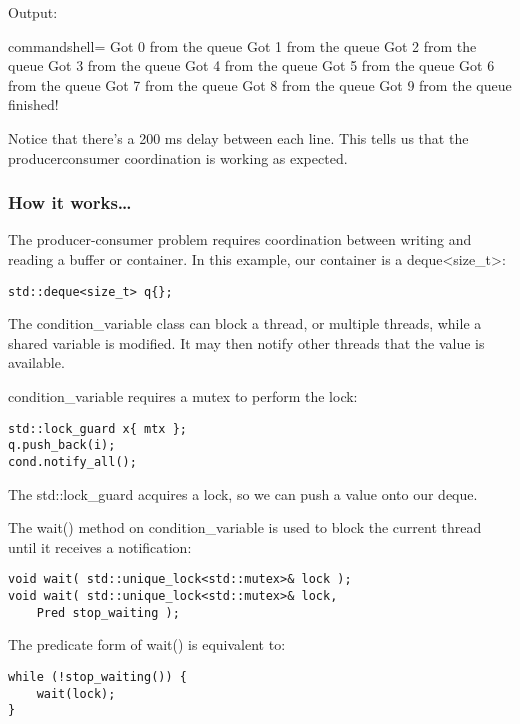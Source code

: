 \begin{itemize}
Output:

\begin{tcblisting}{commandshell={}}
Got 0 from the queue
Got 1 from the queue
Got 2 from the queue
Got 3 from the queue
Got 4 from the queue
Got 5 from the queue
Got 6 from the queue
Got 7 from the queue
Got 8 from the queue
Got 9 from the queue
finished!
\end{tcblisting}

Notice that there's a 200 ms delay between each line. This tells us that the producerconsumer coordination is working as expected.

\end{itemize}

\subsubsection{How it works…}

The producer-consumer problem requires coordination between writing and reading a buffer or container. In this example, our container is a deque<size\_t>:

\begin{lstlisting}[style=styleCXX]
std::deque<size_t> q{};
\end{lstlisting}

The condition\_variable class can block a thread, or multiple threads, while a shared variable is modified. It may then notify other threads that the value is available.

condition\_variable requires a mutex to perform the lock:

\begin{lstlisting}[style=styleCXX]
std::lock_guard x{ mtx };
q.push_back(i);
cond.notify_all();
\end{lstlisting}

The std::lock\_guard acquires a lock, so we can push a value onto our deque.

The wait() method on condition\_variable is used to block the current thread until it receives a notification:

\begin{lstlisting}[style=styleCXX]
void wait( std::unique_lock<std::mutex>& lock );
void wait( std::unique_lock<std::mutex>& lock,
	Pred stop_waiting );
\end{lstlisting}

The predicate form of wait() is equivalent to:

\begin{lstlisting}[style=styleCXX]
while (!stop_waiting()) {
	wait(lock);
}
\end{lstlisting}

